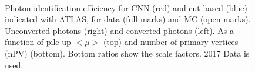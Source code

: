 \begin{figure}[htbp]
    \centering
	 \\
    \caption{Photon identification efficiency for CNN (red) and cut-based (blue) indicated with ATLAS, for data (full marks) and MC (open marks). Unconverted photons (right) and converted photons (left). As a function of pile up $<\mu>$ (top) and number of primary vertices (nPV) (bottom). Bottom ratios show the scale factors. 2017 Data is used.}
    \label{fig:gamma:CNN:Zllg:MU}
\end{figure}
